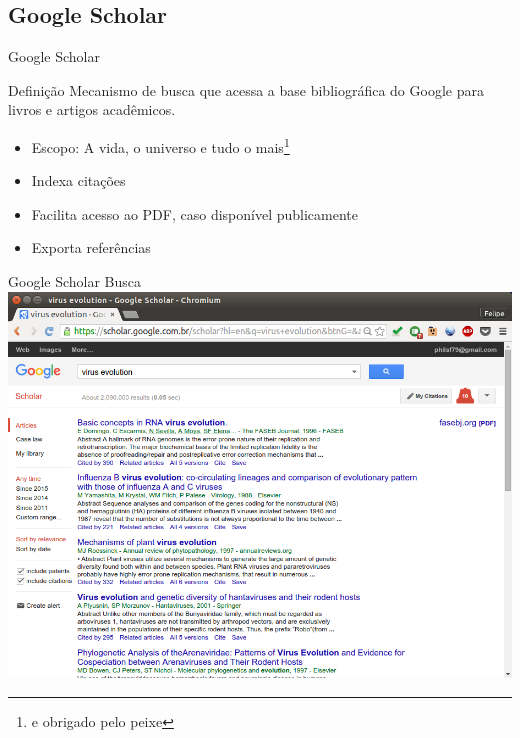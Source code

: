 \documentclass{beamer}
\begin{document}
\subsection{Google Scholar}

\begin{frame}{Google Scholar}
  \begin{block}{Definição}
    Mecanismo de busca que acessa a base bibliográfica do Google para
    livros e artigos acadêmicos.
  \end{block}
  \begin{itemize}
    \footnotesize
  \item Escopo: A vida, o universo e tudo o mais\footnote{e obrigado
      pelo peixe}
  \item Indexa citações
  \item Facilita acesso ao PDF, caso disponível publicamente
  \item Exporta referências
  \end{itemize}
\end{frame}

\begin{frame}{Google Scholar Busca}
  \centering
  \includegraphics[height=.85\textheight]{Busca/scholar-busca1}
\end{frame}
\end{document}
